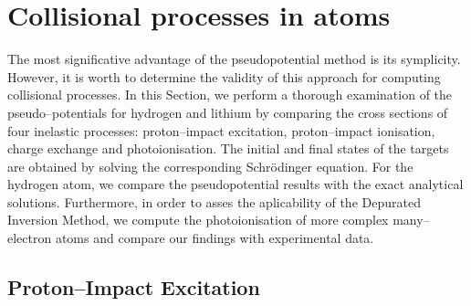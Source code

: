 \documentclass[10pt]{article}
\begin{document}
\section{Collisional processes in atoms}
\label{sec:colproc}

The most significative advantage of the pseudopotential method is 
its symplicity. However, it is worth to determine the validity
of this approach for computing collisional processes.
In this Section, we perform a thorough examination of the
pseudo--potentials for hydrogen and 
lithium by comparing the cross sections of four inelastic 
processes: proton--impact excitation, proton--impact ionisation,
charge exchange and photoionisation. The initial and final states
of the targets are obtained by solving the corresponding Schr\"odinger 
equation.
For the hydrogen atom, we compare the pseudopotential results with 
the exact analytical solutions.  
Furthermore, in order to asses the aplicability of the 
Depurated Inversion Method, we compute the photoionisation of 
more complex many--electron atoms and 
compare our findings with experimental data.


\subsection{Proton--Impact Excitation}
\end{document}
